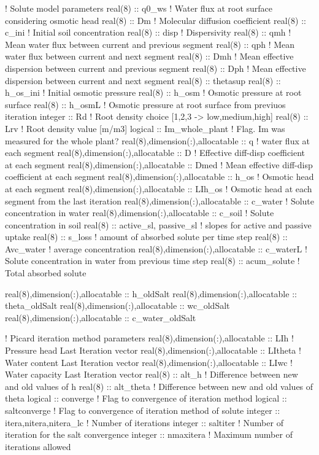 ! Solute model parameters
real(8) :: q0_ws				! Water flux at root surface considering osmotic head
real(8) :: Dm					! Molecular diffusion coefficient
real(8) :: c_ini				! Initial soil concentration
real(8) :: disp					! Dispersivity
real(8) :: qmh					! Mean water flux between current and previous segment
real(8) :: qph					! Mean water flux between current and next segment
real(8) :: Dmh					! Mean effective dispersion between current and previous segment
real(8) :: Dph                                  ! Mean effective dispersion between current and next segment
real(8) :: thetasup
real(8) :: h_os_ini				! Initial osmotic pressure
real(8) :: h_osm				! Osmotic pressure at root surface
real(8) :: h_osmL				! Osmotic pressure at root surface from previuos iteration
integer :: Rd					! Root density choice [1,2,3 -> low,medium,high]
real(8) :: Lrv					! Root density value [m/m3]
logical :: Im_whole_plant			! Flag. Im was measured for the whole plant?
real(8),dimension(:),allocatable :: q	  	! water flux at each segment
real(8),dimension(:),allocatable :: D	  	! Effective diff-disp coefficient at each segment
real(8),dimension(:),allocatable :: Dmed  	! Mean effective diff-disp coefficient at each segment
real(8),dimension(:),allocatable :: h_os	! Osmotic head at each segment
real(8),dimension(:),allocatable :: LIh_os	! Osmotic head at each segment from the last iteration
real(8),dimension(:),allocatable :: c_water	! Solute concentration in water
real(8),dimension(:),allocatable :: c_soil	! Solute concentration in soil
real(8) :: active_sl, passive_sl		! slopes for active and passive uptake
real(8) :: s_loss				! amount of absorbed solute per time step
real(8) :: Avc_water				! average concentration
real(8),dimension(:),allocatable :: c_waterL	! Solute concentration in water from previous time step
real(8) :: acum_solute				! Total absorbed solute

real(8),dimension(:),allocatable :: h_oldSalt
real(8),dimension(:),allocatable :: theta_oldSalt
real(8),dimension(:),allocatable :: wc_oldSalt
real(8),dimension(:),allocatable :: c_water_oldSalt

! Picard iteration method parameters
real(8),dimension(:),allocatable :: LIh		! Pressure head Last Iteration vector
real(8),dimension(:),allocatable :: LItheta	! Water content Last Iteration vector
real(8),dimension(:),allocatable :: LIwc	! Water capacity Last Iteration vector
real(8) :: alt_h				! Difference between new and old values of h
real(8) :: alt_theta				! Difference between new and old values of theta
logical :: converge				! Flag to convergence of iteration method
logical :: saltconverge				! Flag to convergence of iteration method of solute
integer :: itera,nitera,nitera_lc		! Number of iterations
integer :: saltiter				! Number of iteration for the salt convergence
integer :: nmaxitera				! Maximum number of iterations allowed


